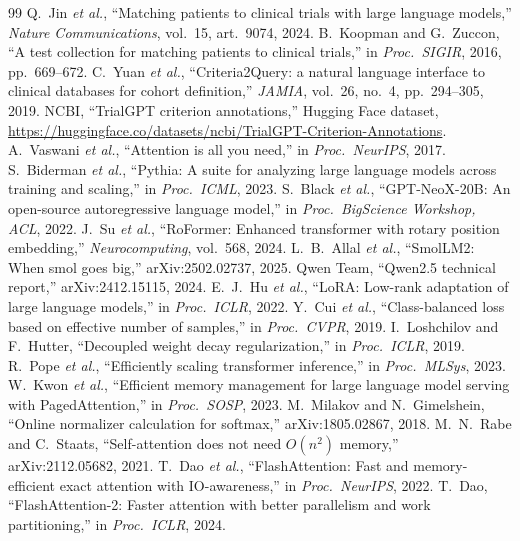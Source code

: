 \begin{thebibliography}{99}\footnotesize
{} Q.~Jin \emph{et al.}, ``Matching patients to clinical trials with large language models,'' \emph{Nature Communications}, vol.~15, art.~9074, 2024.
 B.~Koopman and G.~Zuccon, ``A test collection for matching patients to clinical trials,'' in \emph{Proc.\ SIGIR}, 2016, pp.~669--672.
 C.~Yuan \emph{et al.}, ``Criteria2Query: a natural language interface to clinical databases for cohort definition,'' \emph{JAMIA}, vol.~26, no.~4, pp.~294--305, 2019.
 NCBI, ``TrialGPT criterion annotations,'' Hugging Face dataset, \url{https://huggingface.co/datasets/ncbi/TrialGPT-Criterion-Annotations}.
 A.~Vaswani \emph{et al.}, ``Attention is all you need,'' in \emph{Proc.\ NeurIPS}, 2017.
 S.~Biderman \emph{et al.}, ``Pythia: A suite for analyzing large language models across training and scaling,'' in \emph{Proc.\ ICML}, 2023.
 S.~Black \emph{et al.}, ``GPT-NeoX-20B: An open-source autoregressive language model,'' in \emph{Proc.\ BigScience Workshop, ACL}, 2022.
 J.~Su \emph{et al.}, ``RoFormer: Enhanced transformer with rotary position embedding,'' \emph{Neurocomputing}, vol.~568, 2024.
 L.~B.~Allal \emph{et al.}, ``SmolLM2: When smol goes big,'' arXiv:2502.02737, 2025.
 Qwen Team, ``Qwen2.5 technical report,'' arXiv:2412.15115, 2024.
 E.~J.~Hu \emph{et al.}, ``LoRA: Low-rank adaptation of large language models,'' in \emph{Proc.\ ICLR}, 2022.
 Y.~Cui \emph{et al.}, ``Class-balanced loss based on effective number of samples,'' in \emph{Proc.\ CVPR}, 2019.
 I.~Loshchilov and F.~Hutter, ``Decoupled weight decay regularization,'' in \emph{Proc.\ ICLR}, 2019.
 R.~Pope \emph{et al.}, ``Efficiently scaling transformer inference,'' in \emph{Proc.\ MLSys}, 2023.
 W.~Kwon \emph{et al.}, ``Efficient memory management for large language model serving with PagedAttention,'' in \emph{Proc.\ SOSP}, 2023.
 M.~Milakov and N.~Gimelshein, ``Online normalizer calculation for softmax,'' arXiv:1805.02867, 2018.
 M.~N.~Rabe and C.~Staats, ``Self-attention does not need $O(n^2)$ memory,'' arXiv:2112.05682, 2021.
 T.~Dao \emph{et al.}, ``FlashAttention: Fast and memory-efficient exact attention with IO-awareness,'' in \emph{Proc.\ NeurIPS}, 2022.
 T.~Dao, ``FlashAttention-2: Faster attention with better parallelism and work partitioning,'' in \emph{Proc.\ ICLR}, 2024.

\end{thebibliography}
